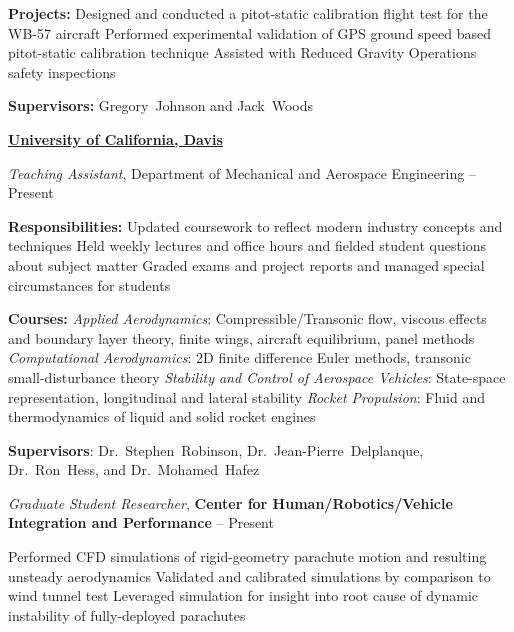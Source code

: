 \documentclass[letterpaper,MMMyyyy,nonstop]{simpleresumecv}
\begin{document}
\begin{body}
\begin{detail}
\SubItem
\textbf{Projects:}
\SubBulletItem
Designed and conducted a pitot-static calibration flight test for the WB-57 aircraft
\SubBulletItem
Performed experimental validation of GPS ground speed based pitot-static calibration technique
\SubBulletItem
Assisted with Reduced Gravity Operations safety inspections

\SubItem
\textbf{Supervisors:}
Gregory~Johnson and
Jack~Woods
\end{detail}


\Gap

\href{http://mae.ucdavis.edu/}
{\textbf{University of California, Davis}}

\GapNoBreak
\BulletItem
\emph{Teaching Assistant}, Department of Mechanical and Aerospace Engineering
\hfill
{} --
Present
\begin{detail}
\SubItem
\textbf{Responsibilities:}
\SubBulletItem
Updated coursework to reflect modern industry concepts and techniques
\SubBulletItem
Held weekly lectures and office hours and fielded student questions about subject matter
\SubBulletItem
Graded exams and project reports and managed special circumstances for students

\SubItem
\textbf{Courses:}
\SubBulletItem
\emph{Applied Aerodynamics}:
    {\small Compressible/Transonic flow, viscous effects and boundary layer theory, finite wings, aircraft equilibrium, panel methods}
\SubBulletItem
\emph{Computational Aerodynamics}:
    {\small 2D finite difference Euler methods, transonic small-disturbance theory}
\SubBulletItem
\emph{Stability and Control of Aerospace Vehicles}:
    {\small State-space representation, longitudinal and lateral stability}
\SubBulletItem
\emph{Rocket Propulsion}:
    {\small Fluid and thermodynamics of liquid and solid rocket engines}

\SubItem
\textbf{Supervisors}:
Dr.~Stephen~Robinson,
Dr.~Jean-Pierre~Delplanque,
Dr.~Ron~Hess, and
Dr.~Mohamed~Hafez


\end{detail}


\GapNoBreak
\BulletItem
\emph{Graduate Student Researcher}, \textbf{Center for Human/Robotics/Vehicle Integration and Performance}
\hfill
{} --
Present
\begin{detail}

\SubBulletItem
Performed CFD simulations of rigid-geometry parachute motion and resulting unsteady aerodynamics
\SubBulletItem
Validated and calibrated simulations by comparison to wind tunnel test
\SubBulletItem
Leveraged simulation for insight into root cause of dynamic instability of fully-deployed parachutes


\end{detail}
\end{body}
\end{document}
